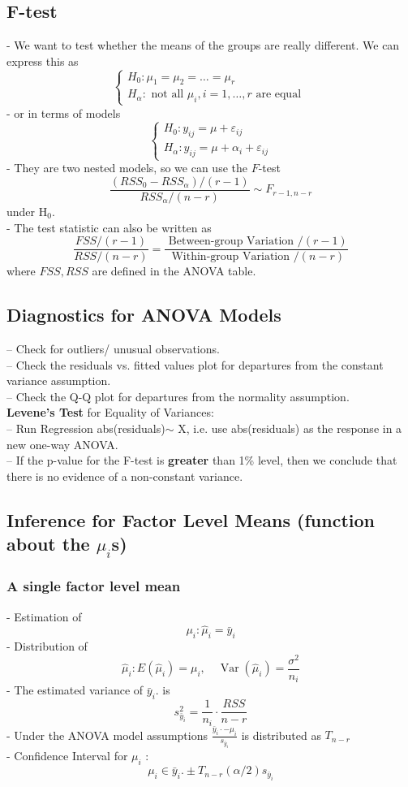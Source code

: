 \documentclass[11pt,a4paper]{article}
\begin{document}
\subsection{F-test}
- We want to test whether the means of the groups are really different. We can express this as
$$
\left\{\begin{array}{l}
H_{0}: \mu_{1}=\mu_{2}=\ldots=\mu_{r} \\
H_{\alpha}: \text { not all } \mu_{i}, i=1, \ldots, r \text { are equal }
\end{array}\right.
$$
- or in terms of models
$$
\left\{\begin{array}{l}
H_{0}: y_{i j}=\mu+\varepsilon_{i j} \\
H_{\alpha}: y_{i j}=\mu+\alpha_{i}+\varepsilon_{i j}
\end{array}\right.
$$
- They are two nested models, so we can use the $F$-test
$$
\frac{\left(R S S_{0}-R S S_{\alpha}\right) /(r-1)}{R S S_{\alpha} /(n-r)} \sim F_{r-1, n-r}
$$
under $\mathrm{H}_{0}$.\\
- The test statistic can also be written as
$$
\frac{F S S /(r-1)}{R S S /(n-r)}=\frac{\text { Between-group Variation } /(r-1)}{\text { Within-group Variation } /(n-r)}
$$
where $F S S, R S S$ are defined in the ANOVA table.

\subsection{Diagnostics for ANOVA Models}
– Check for outliers/ unusual observations.\\
– Check the residuals vs. ﬁtted values plot for departures from the constant variance assumption.\\
– Check the Q-Q plot for departures from the normality assumption.\\
\textbf{Levene’s Test} for Equality of Variances:\\
– Run Regression abs(residuals)$\sim$ X, i.e. use abs(residuals) as the response in a new one-way ANOVA.\\
– If the p-value for the F-test is \textbf{greater} than 1\% level, then we conclude that there is no evidence of a non-constant variance.

\subsection{Inference for Factor Level Means (function about the $\mu_i$s)}
\subsubsection{A single factor level mean}
- Estimation of $$\mu_{i}: \hat{\mu}_{i}=\bar{y}_{i}$$
- Distribution of $$\hat{\mu}_{i}: E\left(\hat{\mu}_{i}\right)=\mu_{i}, \quad \operatorname{Var}\left(\hat{\mu}_{i}\right)=\frac{\sigma^{2}}{n_{i}}$$
- The estimated variance of $\bar{y}_{i}$. is $$s_{\bar{y}_{i}}^{2}=\frac{1}{n_{i}} \cdot \frac{R S S}{n-r}$$
- Under the ANOVA model assumptions
$\frac{\bar{y}_{i} \cdot-\mu_{i}}{s_{\bar{y}_{i}}}$ is distributed as $T_{n-r}$\\
- Confidence Interval for $\mu_{i}$ :
$$
\mu_{i} \in \bar{y}_{i} . \pm T_{n-r}(\alpha / 2) s_{\bar{y}_{i}}
$$
\end{document}
